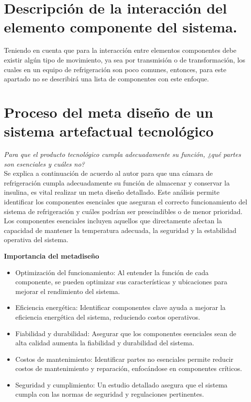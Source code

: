 \newpage
\section{Descripción de la interacción del elemento componente del sistema.}

Teniendo en cuenta que para la interacción entre elementos componentes debe existir algún tipo de movimiento, ya sea por transmisión o de transformación, los cuales en un equipo de refrigeración son poco comunes, entonces, para este apartado no se describirá una lista de componentes con este enfoque.



\section{Proceso del meta diseño de un sistema artefactual tecnológico}

\textit{Para que el producto tecnológico cumpla adecuadamente su función, ¿qué partes son esenciales y cuáles no?}\\


Se explica a continuación de acuerdo al autor \cite{de-leon-no-date} para que una cámara de refrigeración cumpla adecuadamente su función de almacenar y conservar la insulina, es vital realizar un meta diseño detallado. Este análisis permite identificar los componentes esenciales que aseguran el correcto funcionamiento del sistema de refrigeración y cuáles podrían ser prescindibles o de menor prioridad. Los componentes esenciales incluyen aquellos que directamente afectan la capacidad de mantener la temperatura adecuada, la seguridad y la estabilidad operativa del sistema.

\textbf{Importancia del metadiseño}
\begin{itemize}
	\item Optimización del funcionamiento: Al entender la función de cada componente, se pueden optimizar sus características y ubicaciones para mejorar el rendimiento del sistema.
	\item Eficiencia energética: Identificar componentes clave ayuda a mejorar la eficiencia energética del sistema, reduciendo costos operativos.
	\item Fiabilidad y durabilidad: Asegurar que los componentes esenciales sean de alta calidad aumenta la fiabilidad y durabilidad del sistema.
	\item Costos de mantenimiento: Identificar partes no esenciales permite reducir costos de mantenimiento y reparación, enfocándose en componentes críticos.
	\item Seguridad y cumplimiento: Un estudio detallado asegura que el sistema cumpla con las normas de seguridad y regulaciones pertinentes.
	
\end{itemize}


